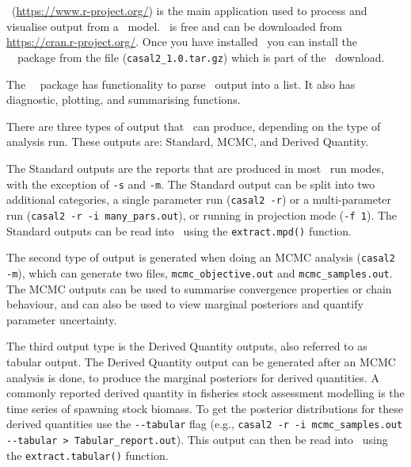 \section{ \label{sec:PostProcessing}}

\R\ (\url{https://www.r-project.org/}) is the main application used to process and visualise output from a \CNAME\ model. \R\ is free and can be downloaded from \url{https://cran.r-project.org/}. Once you have installed \R\ you can install the \cname\ \R\ package from the file (\texttt{casal2\_1.0.tar.gz}) which is part of the \CNAME\ download.

The \CNAME\ \R\ package has functionality to parse \CNAME\ output into a list. It also has diagnostic, plotting, and summarising functions.

There are three types of output that \CNAME\ can produce, depending on the type of analysis run. These outputs are: Standard, MCMC, and Derived Quantity.

The Standard outputs are the reports that are produced in most \CNAME\ run modes, with the exception of \texttt{-s} and \texttt{-m}. The Standard output can be split into two additional categories, a single parameter run (\texttt{casal2 -r}) or a multi-parameter run (\texttt{casal2 -r -i many\_pars.out}), or running in projection mode (\texttt{-f 1}). The Standard outputs can be read into \R\ using the \texttt{extract.mpd()} function.

The second type of output is generated when doing an MCMC analysis (\texttt{casal2 -m}), which can generate two files, \texttt{mcmc\_objective.out} and \texttt{mcmc\_samples.out}. The MCMC outputs can be used to summarise convergence properties or chain behaviour, and can also be used to view marginal posteriors and quantify parameter uncertainty.

The third output type is the Derived Quantity outputs, also referred to as tabular output. The Derived Quantity output can be generated after an MCMC analysis is done, to produce the marginal posteriors for derived quantities. A commonly reported derived quantity in fisheries stock assessment modelling is the time series of spawning stock biomass. To get the posterior distributions for these derived quantities use the \texttt{-{}-tabular} flag (e.g., \texttt{casal2 -r -i mcmc\_samples.out -{}-tabular > Tabular\_report.out}). This output can then be read into \R\ using the \texttt{extract.tabular()} function.

